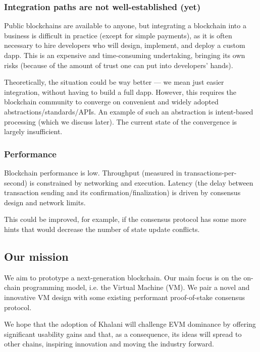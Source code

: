 \documentclass[a4paper]{article}
\begin{document}
\subsubsection{Integration paths are not well-established (yet)}

Public blockchains are available to anyone, but integrating a blockchain into a business is difficult in practice (except for simple payments), as it is often necessary to hire developers who will design, implement, and deploy a custom dapp. This is an expensive and time-consuming undertaking, bringing its own risks (because of the amount of trust one can put into developers' hands).

Theoretically, the situation could be way better --- we mean just easier integration, without having to build a full dapp. However, this requires the blockchain community to converge on convenient and widely adopted abstractions/standards/APIs. An example of such an abstraction is intent-based processing (which we discuss later). The current state of the convergence is largely insufficient.

\subsubsection{Performance}

Blockchain performance is low. Throughput (measured in transactions-per-second) is constrained by networking and execution. Latency (the delay between transaction sending and its confirmation/finalization) is driven by consensus design and network limits.

This could be improved, for example, if the consensus protocol has some more hints that would decrease the number of state update conflicts.

\subsection{Our mission}

We aim to prototype a next-generation blockchain. Our main focus is on the on-chain programming model, i.e. the Virtual Machine (VM). We pair a novel and innovative VM design with some existing performant proof-of-stake consensus protocol.

We hope that the adoption of Khalani will challenge EVM dominance by offering significant usability gains and that, as a consequence, its ideas will spread to other chains, inspiring innovation and moving the industry forward.
\end{document}
